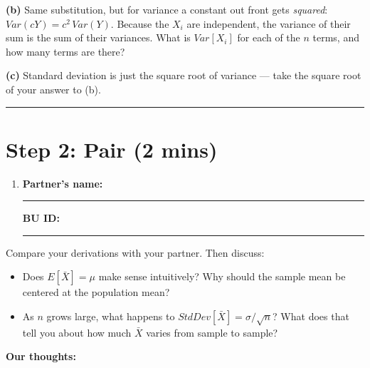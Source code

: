 \documentclass{article}
\newcommand{\nameblank}{\rule{1.75in}{0.4pt}}
\newcommand{\idblank}{\rule{1.55in}{0.4pt}}
\begin{document}
\vspace{0.2in}

\textbf{(b)} Same substitution, but for variance a constant out front gets \emph{squared}: $Var(cY) = c^2\,Var(Y)$. Because the $X_i$ are independent, the variance of their sum is the sum of their variances. What is $Var[X_i]$ for each of the $n$ terms, and how many terms are there?

\vspace{0.2in}

\textbf{(c)} Standard deviation is just the square root of variance --- take the square root of your answer to (b).

\vspace{0.2in}
\noindent\rule{\linewidth}{0.4pt}
\vspace{0.2in}

\section*{Step 2: Pair (2 mins)}

\begin{enumerate}[label=\arabic*.,leftmargin=*,itemsep=.7em, start=2]
  \item \textbf{Partner's name:} \nameblank \hfill \textbf{BU ID:} \idblank
\end{enumerate}

Compare your derivations with your partner. Then discuss:

\begin{itemize}
  \item Does $E[\bar X] = \mu$ make sense intuitively? Why should the sample mean be centered at the population mean?
  \item As $n$ grows large, what happens to $StdDev[\bar X] = \sigma/\sqrt{n}$? What does that tell you about how much $\bar X$ varies from sample to sample?
\end{itemize}

\textbf{Our thoughts:}
\vfill
\end{document}
